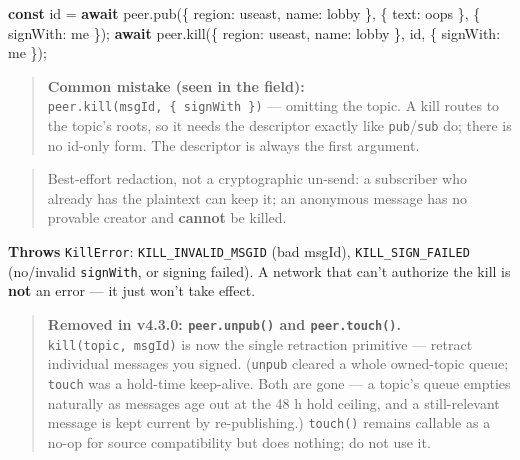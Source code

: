\documentclass[
  nobib]{tufte-handout}
\newenvironment{Shaded}{}{}
\newcommand{\ControlFlowTok}[1]{\textcolor[rgb]{0.00,0.44,0.13}{\textbf{#1}}}
\newcommand{\DataTypeTok}[1]{\textcolor[rgb]{0.56,0.13,0.00}{#1}}
\newcommand{\FunctionTok}[1]{\textcolor[rgb]{0.02,0.16,0.49}{#1}}
\newcommand{\KeywordTok}[1]{\textcolor[rgb]{0.00,0.44,0.13}{\textbf{#1}}}
\newcommand{\NormalTok}[1]{#1}
\newcommand{\OperatorTok}[1]{\textcolor[rgb]{0.40,0.40,0.40}{#1}}
\newcommand{\StringTok}[1]{\textcolor[rgb]{0.25,0.44,0.63}{#1}}
\begin{document}
\begin{Shaded}
\begin{Highlighting}[]
\KeywordTok{const}\NormalTok{ id }\OperatorTok{=} \ControlFlowTok{await}\NormalTok{ peer}\OperatorTok{.}\FunctionTok{pub}\NormalTok{(\{ }\DataTypeTok{region}\OperatorTok{:} \StringTok{\textquotesingle{}useast\textquotesingle{}}\OperatorTok{,} \DataTypeTok{name}\OperatorTok{:} \StringTok{\textquotesingle{}lobby\textquotesingle{}}\NormalTok{ \}}\OperatorTok{,}\NormalTok{ \{ }\DataTypeTok{text}\OperatorTok{:} \StringTok{\textquotesingle{}oops\textquotesingle{}}\NormalTok{ \}}\OperatorTok{,}\NormalTok{ \{ }\DataTypeTok{signWith}\OperatorTok{:}\NormalTok{ me \})}\OperatorTok{;}
\ControlFlowTok{await}\NormalTok{ peer}\OperatorTok{.}\FunctionTok{kill}\NormalTok{(\{ }\DataTypeTok{region}\OperatorTok{:} \StringTok{\textquotesingle{}useast\textquotesingle{}}\OperatorTok{,} \DataTypeTok{name}\OperatorTok{:} \StringTok{\textquotesingle{}lobby\textquotesingle{}}\NormalTok{ \}}\OperatorTok{,}\NormalTok{ id}\OperatorTok{,}\NormalTok{ \{ }\DataTypeTok{signWith}\OperatorTok{:}\NormalTok{ me \})}\OperatorTok{;}
\end{Highlighting}
\end{Shaded}

\begin{quote}
\textbf{Common mistake (seen in the field):}
\texttt{peer.kill(msgId,\ \{\ signWith\ \})} --- omitting the topic. A
kill routes to the topic's roots, so it needs the descriptor exactly
like \texttt{pub}/\texttt{sub} do; there is no id-only form. The
descriptor is always the first argument.
\end{quote}

\begin{quote}
Best-effort redaction, not a cryptographic un-send: a subscriber who
already has the plaintext can keep it; an anonymous message has no
provable creator and \textbf{cannot} be killed.
\end{quote}

\textbf{Throws} \texttt{KillError}: \texttt{KILL\_INVALID\_MSGID} (bad
msgId), \texttt{KILL\_SIGN\_FAILED} (no/invalid \texttt{signWith}, or
signing failed). A network that can't authorize the kill is \textbf{not}
an error --- it just won't take effect.

\begin{quote}
\textbf{Removed in v4.3.0: \texttt{peer.unpub()} and
\texttt{peer.touch()}.} \texttt{kill(topic,\ msgId)} is now the single
retraction primitive --- retract individual messages you signed.
(\texttt{unpub} cleared a whole owned-topic queue; \texttt{touch} was a
hold-time keep-alive. Both are gone --- a topic's queue empties
naturally as messages age out at the 48 h hold ceiling, and a
still-relevant message is kept current by re-publishing.)
\texttt{touch()} remains callable as a no-op for source compatibility
but does nothing; do not use it.
\end{quote}
\end{document}
